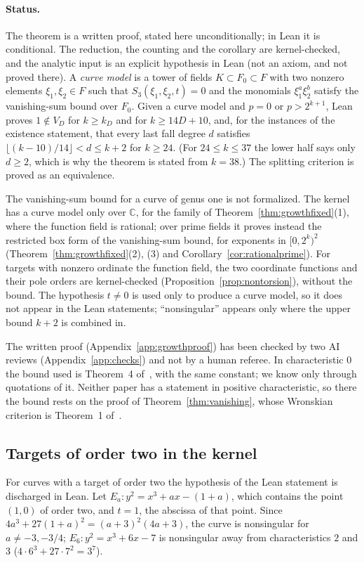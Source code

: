 \documentclass[11pt]{article}
\theoremstyle{definition}\newtheorem{definition}[theorem]{Definition}
\theoremstyle{remark}\newtheorem{remark}[theorem]{Remark}
\begin{document}
\paragraph{Status.} The theorem is a written proof, stated here
unconditionally; in Lean it is conditional. The reduction, the counting and
the corollary are kernel-checked, and the analytic input is an explicit
hypothesis in Lean (not an axiom, and not proved there). A \emph{curve
model} is a tower of fields $K\subset F_0\subset F$ with two nonzero
elements $\xi_1,\xi_2\in F$ such that $S_3(\xi_1,\xi_2,t)=0$ and the
monomials $\xi_1^a\xi_2^b$ satisfy the vanishing-sum bound over $F_0$. Given
a curve model and $p=0$ or $p>2^{k+1}$, Lean proves $1\notin V_D$ for
$k\ge k_D$ and for $k\ge14D+10$, and, for the instances of the existence
statement, that every last fall degree $d$ satisfies
$\lfloor(k-10)/14\rfloor<d\le k+2$ for $k\ge24$. (For $24\le k\le37$ the
lower half says only $d\ge2$, which is why the theorem is stated from
$k=38$.) The splitting criterion is proved as an equivalence.

The vanishing-sum bound for a curve of genus one is not formalized. The
kernel has a curve model only over $\mathbb{C}$, for the family of
Theorem~\ref{thm:growthfixed}(1), where the function field is rational;
over prime fields it proves instead the restricted box form of the
vanishing-sum bound, for exponents in $[0,2^k)^2$
(Theorem~\ref{thm:growthfixed}(2), (3) and
Corollary~\ref{cor:rationalprime}). For targets with nonzero ordinate the
function field, the two coordinate functions and their pole orders are
kernel-checked (Proposition~\ref{prop:nontorsion}), without the bound. The
hypothesis $t\ne0$ is used only to produce a curve model, so it does not
appear in the Lean statements; ``nonsingular'' appears only where the upper
bound $k+2$ is combined in.

The written proof (Appendix~\ref{app:growthproof}) has been checked by two
AI reviews (Appendix~\ref{app:checks}) and not by a human referee. In
characteristic $0$ the bound used is Theorem~4 of~\cite{voloch85}, with the
same constant; we know \cite{bm86} only through quotations of it. Neither
paper has a statement in positive characteristic, so there the bound rests
on the proof of Theorem~\ref{thm:vanishing}, whose Wronskian criterion is
Theorem~1 of~\cite{gv87}.

\subsection{Targets of order two in the kernel}\label{sec:growthfixed}
For curves with a target of order two the hypothesis of the Lean statement
is discharged in Lean. Let $E_a\colon y^2=x^3+ax-(1+a)$, which contains the
point $(1,0)$ of order two, and $t=1$, the abscissa of that point. Since
$4a^3+27(1+a)^2=(a+3)^2(4a+3)$, the curve is nonsingular for $a\ne-3,-3/4$;
$E_6\colon y^2=x^3+6x-7$ is nonsingular away from characteristics $2$ and $3$
($4\cdot6^3+27\cdot7^2=3^7$).
\end{document}
